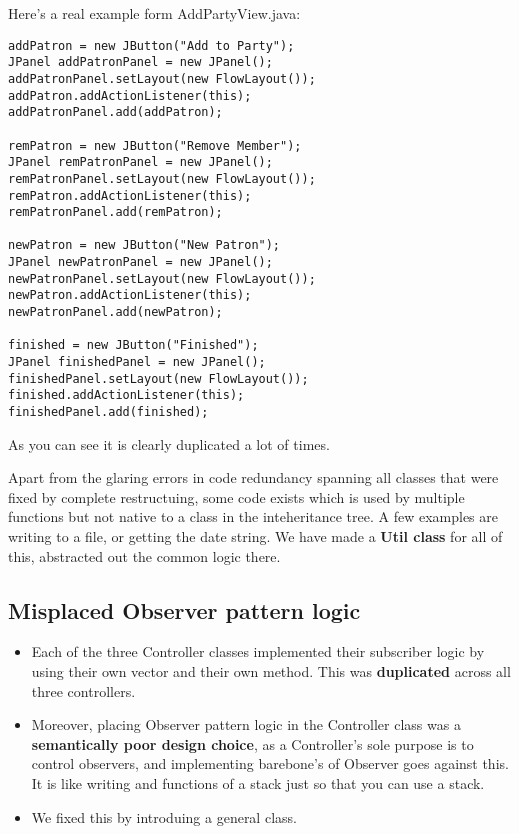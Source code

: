 Here's a real example form AddPartyView.java:

\begin{verbatim}
addPatron = new JButton("Add to Party");
JPanel addPatronPanel = new JPanel();
addPatronPanel.setLayout(new FlowLayout());
addPatron.addActionListener(this);
addPatronPanel.add(addPatron);

remPatron = new JButton("Remove Member");
JPanel remPatronPanel = new JPanel();
remPatronPanel.setLayout(new FlowLayout());
remPatron.addActionListener(this);
remPatronPanel.add(remPatron);

newPatron = new JButton("New Patron");
JPanel newPatronPanel = new JPanel();
newPatronPanel.setLayout(new FlowLayout());
newPatron.addActionListener(this);
newPatronPanel.add(newPatron);

finished = new JButton("Finished");
JPanel finishedPanel = new JPanel();
finishedPanel.setLayout(new FlowLayout());
finished.addActionListener(this);
finishedPanel.add(finished);
\end{verbatim}

As you can see it is clearly duplicated a lot of times.

Apart from the glaring errors in code redundancy spanning all classes that were fixed by complete restructuing, some code exists which is used by multiple functions but not native to a class in the inteheritance tree. A few examples are writing to a file, or getting the date string. We have made a \textbf{Util class} for all of this, abstracted out the common logic there.

\subsection{Misplaced Observer pattern logic}

\begin{itemize}

	\item Each of the three Controller classes implemented their subscriber logic by using their own  vector and their own  method. This was \textbf{duplicated} across all three controllers.
	\item Moreover, placing Observer pattern logic in the Controller class was a \textbf{semantically poor design choice}, as a Controller's sole purpose is to control observers, and implementing barebone's of Observer goes against this. It is like writing  and  functions of a stack just so that you can use a stack.
	\item We fixed this by introduing a general  class.

\end{itemize}

